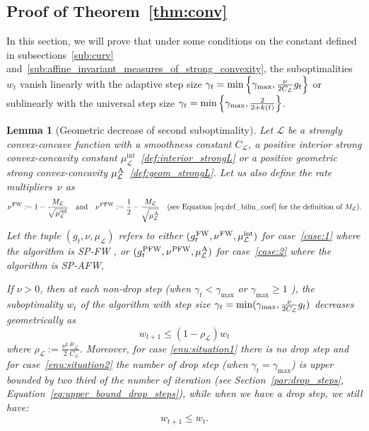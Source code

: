 \documentclass[twoside]{article}
\renewcommand{\L}{\mathcal{L}}
\newcommand{\wt}{w_t}
\newcommand{\wtt}{w_{t+1}}
\newcommand{\gap}{g_{t}}
\newcommand{\CondNumb}{\nu}
\newtheorem{lemma}[definition]{Lemma}
\newcommand{\stepsize}{\gamma}
\newcommand{\stepmax}{\stepsize_{\textnormal{\scriptsize max}}} %
\newcommand{\FW}{{\hspace{0.05em}\textnormal{FW}}}
\newcommand{\PW}{{\hspace{0.05em}\textnormal{PFW}}}
\newcommand{\away}{{\hspace{0.05em}\textnormal{A}}}
\newcommand{\muIntL}{\mu^{\text{int}}_\L} %
\newcommand{\0}{\mathbf{0}} %
\begin{document}
\subsection{Proof of Theorem~\ref{thm:conv}}
  \label{subsec:proof_main_thm}
  In this section, we will prove that under some conditions on the constant defined in subsections~\ref{sub:curv} and~\ref{sub:affine_invariant_measures_of_strong_convexity}, the suboptimalities $\wt$
  vanish linearly with the adaptive step size $\gamma_t = \min \left\{\stepmax,\frac{\CondNumb}{2C_\L}\gap\right\}$ or sublinearly with the universal step size $\gamma_t = \min \left\{\stepmax,\frac{2}{2+k(t)}\right\}$.
  \begin{lemma}[Geometric decrease of second suboptimality] 
    \label{lemme:Lin} Let $\L$ be a 
    strongly convex-concave function with a smoothness constant $C_\L$, a positive interior strong convex-concavity constant $\muIntL$~\eqref{def:interior_strongL} or a positive geometric strong convex-concavity $\mu^{\away}_\L$~\eqref{def:geom_strongL}. Let us also define the rate multipliers~$\CondNumb$ as
  \begin{equation}
    \CondNumb^{\FW} :=1- \frac{M_\L }{\sqrt{\muIntL}} \quad\text{and}\quad \CondNumb^{\PW} := \frac{1}{2}- \frac{M_\L }{\sqrt{\mu^{\away}_\L}} \quad(\text{see Equation~\eqref{eq:def_bilin_coef} for the definition of } M_\L).
  \end{equation}
    Let the tuple $(\gap,\CondNumb,\mu_\L)$ refers to
  either $(\gap^{\FW},\CondNumb^{\FW},\muIntL)$ for case~\eqref{case:1} where the algorithm is SP-FW , or $(\gap^{\PW},\CondNumb^{\PW},\mu^{\away}_\L)$ for case~\eqref{case:2} %
  where the algorithm is SP-AFW,

        If $\CondNumb > 0$, then  at each non-drop step (when $\gamma_t < \gamma_{\max}$ or $ \gamma_{\max} \geq 1$ ),
        the suboptimality $w_t$ of the algorithm with
        step size $\stepsize_t = \min(\stepmax, \frac{\CondNumb}{2C_\L}\gap)$ decreases
        geometrically as
          \begin{equation} 
             \wtt \leq (1- \rho_\L) \wt
          \end{equation}
        where $\rho_\L := \frac{\CondNumb^2}{2} \frac{\mu_\L}{C_\L}$.
        Moreover, for case \eqref{enu:situation1} there is no drop step and for case~\eqref{enu:situation2} the number of drop step (when $\gamma_t = \gamma_{\max}$) is upper bounded by two third of the number of iteration (see Section~\ref{par:drop_steps}, Equation~\eqref{eq:upper_bound_drop_steps}), while when we have a drop step, we still have:
        \begin{equation}
         \wtt \leq \wt.
        \end{equation}
  \end{lemma}
\end{document}
